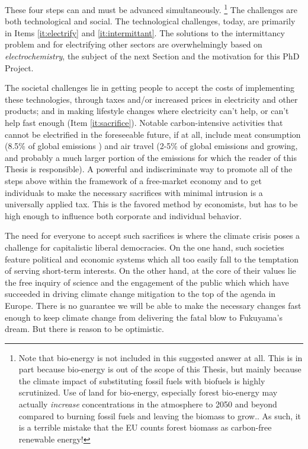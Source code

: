 These four steps can and must be advanced simultaneously.
\footnote{Note that bio-energy is not included in this suggested answer at all. This is in part because bio-energy is out of the scope of this Thesis, but mainly because the climate impact of substituting fossil fuels with biofuels is highly scrutinized. Use of land for bio-energy, especially forest bio-energy may actually \textit{increase}  concentrations in the atmosphere to 2050 and beyond compared to burning fossil fuels and leaving the biomass to grow.\cite{Searchinger2018, Bentsen2017}. As such, it is a terrible mistake that the EU counts forest biomass as carbon-free renewable energy!}
The challenges are both technological and social. The technological challenges, today, are primarily in Items \ref{it:electrify} and \ref{it:intermittant}. The solutions to the intermittancy problem and for electrifying other sectors are overwhelmingly based on \textit{electrochemistry}, the subject of the next Section and the motivation for this PhD Project.

The societal challenges lie in getting people to accept the costs of implementing these technologies, through taxes and/or increased prices in electricity and other products; and in making lifestyle changes where electricity can't help, or can't help fast enough (Item \ref{it:sacrifice}). Notable carbon-intensive activities that cannot be electrified in the foreseeable future, if at all, include meat consumption (8.5\% of global emissions \cite{Caro2017}) and air travel (2-5\% of global emissions and growing\cite{CarbonBrief_aviation, Larsson2018}, and probably a much larger portion of the emissions for which the reader of this Thesis is responsible). A powerful and indiscriminate way to promote all of the steps above within the framework of a free-market economy and to get individuals to make the necessary sacrifices with minimal intrusion is a universally applied  tax. This is the favored method by economists\cite{CarbonTax_Economist}, but has to be high enough to influence both corporate and individual behavior.

The need for everyone to accept such sacrifices is where the climate crisis poses a challenge for capitalistic liberal democracies. On the one hand, such societies feature political and economic systems which all too easily fall to the temptation of serving short-term interests. On the other hand, at the core of their values lie the free inquiry of science and the engagement of the public which which have succeeded in driving climate change mitigation to the top of the agenda in Europe. There is no guarantee we will be able to make the necessary changes fast enough to keep climate change from delivering the fatal blow to Fukuyama's dream. But there is reason to be optimistic.


